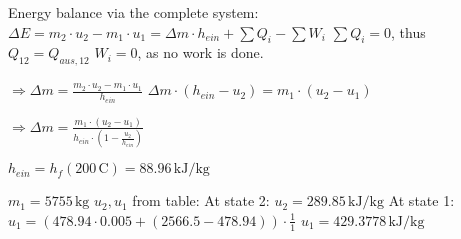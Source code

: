 Energy balance via the complete system:  
\( \Delta E = m_2 \cdot u_2 - m_1 \cdot u_1 = \Delta m \cdot h_{ein} + \sum Q_i - \sum W_i \)  
\( \sum Q_i = 0 \), thus \( Q_{12} = Q_{aus,12} \)  
\( W_i = 0 \), as no work is done.  

\( \Rightarrow \Delta m = \frac{m_2 \cdot u_2 - m_1 \cdot u_1}{h_{ein}} \)  
\( \Delta m \cdot (h_{ein} - u_2) = m_1 \cdot (u_2 - u_1) \)  

\( \Rightarrow \Delta m = \frac{m_1 \cdot (u_2 - u_1)}{h_{ein} \cdot (1 - \frac{u_2}{h_{ein}})} \)  

\( h_{ein} = h_f(200 \, \text{C}) = 88.96 \, \text{kJ/kg} \)  

\( m_1 = 5755 \, \text{kg} \)  
\( u_2, u_1 \) from table:  
At state 2: \( u_2 = 289.85 \, \text{kJ/kg} \)  
At state 1: \( u_1 = (478.94 \cdot 0.005 + (2566.5 - 478.94)) \cdot \frac{1}{1} \)  
\( u_1 = 429.3778 \, \text{kJ/kg} \)